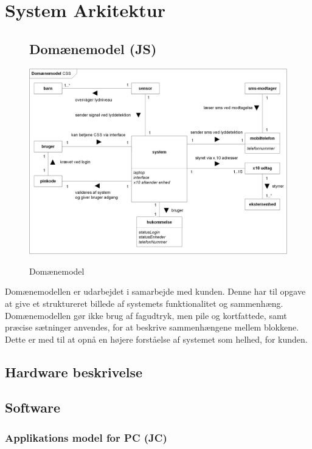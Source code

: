 %
%
\chapter{System Arkitektur}

\begin{figure}[htbp] \centering
\section{Domænemodel (JS)}
{\includegraphics[width=\textwidth]{billeder/diagrammer/Domain_Model}}
\caption{Domænemodel}
\label{lab:domainmodel}
\end{figure}
Domænemodellen er udarbejdet i samarbejde med kunden. Denne har til opgave at give et struktureret billede af systemets funktionalitet og sammenhæng. Domænemodellen gør ikke brug af fagudtryk, men pile og kortfattede, samt præcise sætninger anvendes, for at beskrive sammenhængene mellem blokkene. Dette er med til at opnå en højere forståelse af systemet som helhed, for kunden.

\newpage
\section{Hardware beskrivelse}


\clearpage
\section{Software}

\subsection{Applikations model for PC (JC)}

\clearpage


